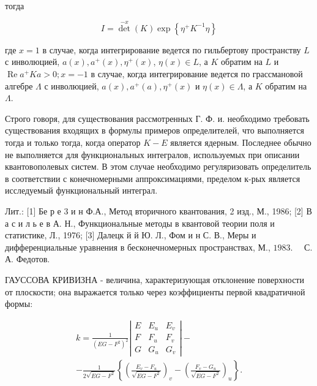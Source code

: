 \documentclass[10pt]{article}
\begin{document}
тогда



\[

I=\operatorname{det}^{-x}(K) \exp \left\{\eta^{+} K^{-1} \eta\right\}

\]



где $x=1$ в случае, когда интегрирование ведется по гильбертову пространству $L$ с инволюцией, $a(x), a^{+}(x), \eta^{+}(x)$, $\eta(x) \in L$, а $K$ обратим на $L$ и $\operatorname{Re} a^{+} K a>0 ; x=-1$ в случае, когда интегрирование ведется по грассмановой алгебре $\Lambda$ с инволюцией, $a(x), a^{+}(a), \eta^{+}(x)$ и $\eta(x) \in \Lambda$, а $K$ обратим на $\Lambda$.



Строго говоря, для существования рассмотренных Г. Ф. и. необходимо требовать существования входящих в формулы примеров определителей, что выполняется тогда и только тогда, когда оператор $K-E$ является ядерным. Последнее обычно не выполняется для функциональных интегралов, используемых при описании квантовополевых систем. В этом случае необходимо регуляризовать определитель в соответствии с конечномерными аппроксимациями, пределом к-рых является исследуемый функциональный интеграл.



Лит.: [1] Бе р е 3 и н Ф.А., Метод вторичного квантования, 2 изд., М., 1986; [2] В а с и л ь е в А. Н., Функциональные методы в квантовой теории поля и статистике, Л., 1976; [3] Далецк й й Ю. Л., Фом и н С. В., Меры и дифференциальные уравнения в бесконечномерных пространствах, М., $1983 . \quad$ С. А. Федотов.



ГАУССОВА КРИВИЗНА - величина, характеризующая отклонение поверхности от плоскости; она выражается только через коэффициенты первой квадратичной формы:



\[

\begin{gathered}

k=\frac{1}{\left(E G-F^{2}\right)^{2}}\left|\begin{array}{lll}

E & E_{u} & E_{v} \\

F & F_{u} & F_{v} \\

G & G_{u} & G_{v}

\end{array}\right|- \\

-\frac{1}{2 \sqrt{E G-F^{2}}}\left\{\left(\frac{E_{v}-F_{u}}{\sqrt{E G-F^{2}}}\right)_{v}-\left(\frac{F_{v}-G_{u}}{\sqrt{E G-F^{2}}}\right)_{u}\right\} .

\end{gathered}

\]
\end{document}
